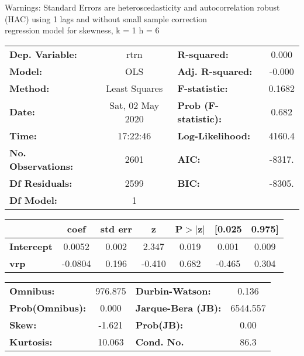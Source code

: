 Warnings: \newline
 [1] Standard Errors are heteroscedasticity and autocorrelation robust (HAC) using 1 lags and without small sample correction\\ 

regression model for skewness, k = 1 h = 6\begin{center}
\begin{tabular}{lclc}
\toprule
\textbf{Dep. Variable:}    &       rtrn       & \textbf{  R-squared:         } &     0.000   \\
\textbf{Model:}            &       OLS        & \textbf{  Adj. R-squared:    } &    -0.000   \\
\textbf{Method:}           &  Least Squares   & \textbf{  F-statistic:       } &    0.1682   \\
\textbf{Date:}             & Sat, 02 May 2020 & \textbf{  Prob (F-statistic):} &    0.682    \\
\textbf{Time:}             &     17:22:46     & \textbf{  Log-Likelihood:    } &    4160.4   \\
\textbf{No. Observations:} &        2601      & \textbf{  AIC:               } &    -8317.   \\
\textbf{Df Residuals:}     &        2599      & \textbf{  BIC:               } &    -8305.   \\
\textbf{Df Model:}         &           1      & \textbf{                     } &             \\
\bottomrule
\end{tabular}
\begin{tabular}{lcccccc}
                   & \textbf{coef} & \textbf{std err} & \textbf{z} & \textbf{P$> |$z$|$} & \textbf{[0.025} & \textbf{0.975]}  \\
\midrule
\textbf{Intercept} &       0.0052  &        0.002     &     2.347  &         0.019        &        0.001    &        0.009     \\
\textbf{vrp}       &      -0.0804  &        0.196     &    -0.410  &         0.682        &       -0.465    &        0.304     \\
\bottomrule
\end{tabular}
\begin{tabular}{lclc}
\textbf{Omnibus:}       & 976.875 & \textbf{  Durbin-Watson:     } &    0.136  \\
\textbf{Prob(Omnibus):} &   0.000 & \textbf{  Jarque-Bera (JB):  } & 6544.557  \\
\textbf{Skew:}          &  -1.621 & \textbf{  Prob(JB):          } &     0.00  \\
\textbf{Kurtosis:}      &  10.063 & \textbf{  Cond. No.          } &     86.3  \\
\bottomrule
\end{tabular}
\end{center}

